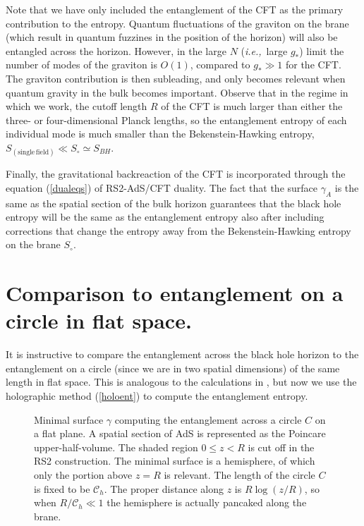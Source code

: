 \documentclass[12pt]{article}
\newcommand{\ie}{{\it i.e.,}\ }
\newcommand{\reef}[1]{(\ref{#1})}
\begin{document}
Note that we have only included the entanglement of the CFT as the
primary contribution to the entropy. Quantum fluctuations of the
graviton on the brane (which result in quantum fuzzines in the position
of the horizon) will also be entangled across the horizon. However, in
the large $N$ (\ie large $g_*$) limit the number of modes of the
graviton is $O(1)$, compared to $g_*\gg 1$ for the CFT. The graviton
contribution is then subleading, and only becomes relevant when quantum
gravity in the bulk becomes important. Observe that in the regime in
which we work, the cutoff length $R$ of the CFT is much larger than
either the three- or four-dimensional Planck lengths, so the
entanglement entropy of each individual mode is much smaller than the
Bekenstein-Hawking entropy, $S_{(\mathrm{single\, field})}\ll
S_{\circ}\simeq S_{BH}$.


Finally, the gravitational backreaction of the CFT is incorporated
through the equation \reef{dualeqs} of RS2-AdS/CFT duality. The fact that the
surface $\gamma_A$ is the same as the spatial section of the bulk
horizon guarantees that the black hole entropy will be the same as the
entanglement entropy also after including corrections that change the
entropy away from the Bekenstein-Hawking entropy on the brane $S_{\circ}$.


\bigskip

\section{Comparison to entanglement on a circle in flat
space.} It is instructive to compare the entanglement across the black
hole horizon to the entanglement on a circle (since we are in two
spatial dimensions) of the same length in flat space. This is analogous
to the calculations in \cite{bkls,sred}, but now we use the holographic
method \reef{holoent} to compute the entanglement entropy.

\begin{figure}%
\begin{center}\leavevmode  %
\epsfxsize=10cm 
\end{center}
\caption{\small Minimal surface $\gamma$ computing the entanglement
across a circle $C$ on a flat plane. A spatial section of AdS is
represented as the Poincare upper-half-volume.
The shaded region $0\leq z<R$ is cut off in the RS2 construction. The minimal
surface is a hemisphere, of which only the portion above $z=R$ is
relevant. The length of the circle $C$ is fixed to be $\mathcal{C}_{h}$.
The proper distance along $z$ is $R\log(z/R)$, so when
$R/\mathcal{C}_{h}\ll 1$ the hemisphere is actually pancaked along the
brane.
}
\label{fig:minsurf2}
\end{figure}
\end{document}
